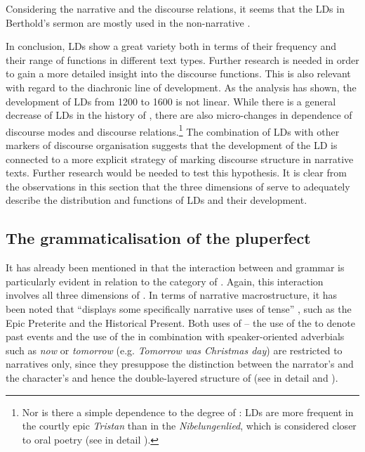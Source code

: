\documentclass[output=paper,colorlinks,citecolor=brown]{langscibook}
\begin{document}
Considering the narrative  and the discourse relations, it seems that the LDs in Berthold's sermon are mostly used in the non-narrative .

In conclusion, LDs show a great variety both in terms of their frequency and their range of functions in different text types. Further research is needed in order to gain a more detailed insight into the discourse functions. This is also relevant with regard to the diachronic line of development. As the analysis has shown, the development of LDs from 1200 to 1600 is not linear. While there is a general decrease of LDs in the history of , there are also micro-changes in dependence of discourse modes and discourse relations.\footnote{Nor is there a simple dependence to the degree of : LDs are more frequent in the courtly epic \textit{Tristan} than in the \textit{Nibelungenlied}, which is considered closer to oral poetry (see in detail \citealt{Zeman2023a}).} The combination of LDs with other markers of discourse organisation suggests that the development of the LD is connected to a more explicit strategy of marking discourse structure in narrative texts. Further research would be needed to test this hypothesis. It is clear from the observations in this section that the three dimensions of  serve to adequately describe the distribution and functions of LDs and their development.


\subsection{The grammaticalisation of the pluperfect}\label{sec:zeman:3.2}
It has already been mentioned in  that the interaction between  and grammar is particularly evident in relation to the category of . Again, this interaction involves all three dimensions of . In terms of narrative macrostructure, it has been noted that  “displays some specifically narrative uses of tense” \citep[94]{Fludernik2012}, such as the Epic Preterite and the Historical Present. Both uses of  – the use of the  to denote past events and the use of the  in combination with speaker-oriented adverbials such as \textit{now} or \textit{tomorrow} (e.g. \textit{Tomorrow was Christmas day}) are restricted to narratives only, since they presuppose the distinction between the narrator's and the character's  and hence the double-layered structure of  (see in detail \citealt{Zeman2010} and \citealt{Zeman2018}). 
\end{document}

